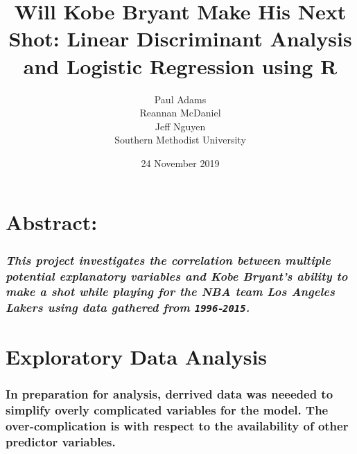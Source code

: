 \documentclass[]{article}
\title{Will Kobe Bryant Make His Next Shot: Linear Discriminant Analysis and
Logistic Regression using R}
\author{Paul Adams \\ Reannan McDaniel \\ Jeff Nguyen \\ Southern Methodist University}
\date{24 November 2019}
\begin{document}
\maketitle

\hypertarget{abstract}{%
\section{\texorpdfstring{\textbf{Abstract:}}{Abstract:}}\label{abstract}}

\hypertarget{this-project-investigates-the-correlation-between-multiple-potential-explanatory-variables-and-kobe-bryants-ability-to-make-a-shot-while-playing-for-the-nba-team-los-angeles-lakers-using-data-gathered-from-1996-2015.}{%
\subsubsection{\texorpdfstring{\emph{This project investigates the
correlation between multiple potential explanatory variables and Kobe
Bryant's ability to make a shot while playing for the NBA team Los
Angeles Lakers using data gathered from
\texttt{1996}-\texttt{2015}.}}{This project investigates the correlation between multiple potential explanatory variables and Kobe Bryant's ability to make a shot while playing for the NBA team Los Angeles Lakers using data gathered from 1996-2015.}}\label{this-project-investigates-the-correlation-between-multiple-potential-explanatory-variables-and-kobe-bryants-ability-to-make-a-shot-while-playing-for-the-nba-team-los-angeles-lakers-using-data-gathered-from-1996-2015.}}

\hypertarget{exploratory-data-analysis}{%
\section{\texorpdfstring{\textbf{Exploratory Data
Analysis}}{Exploratory Data Analysis}}\label{exploratory-data-analysis}}

\hypertarget{in-preparation-for-analysis-derrived-data-was-neeeded-to-simplify-overly-complicated-variables-for-the-model.-the-over-complication-is-with-respect-to-the-availability-of-other-predictor-variables.}{%
\subsubsection{In preparation for analysis, derrived data was neeeded to
simplify overly complicated variables for the model. The
over-complication is with respect to the availability of other predictor
variables.}\label{in-preparation-for-analysis-derrived-data-was-neeeded-to-simplify-overly-complicated-variables-for-the-model.-the-over-complication-is-with-respect-to-the-availability-of-other-predictor-variables.}}
\end{document}
